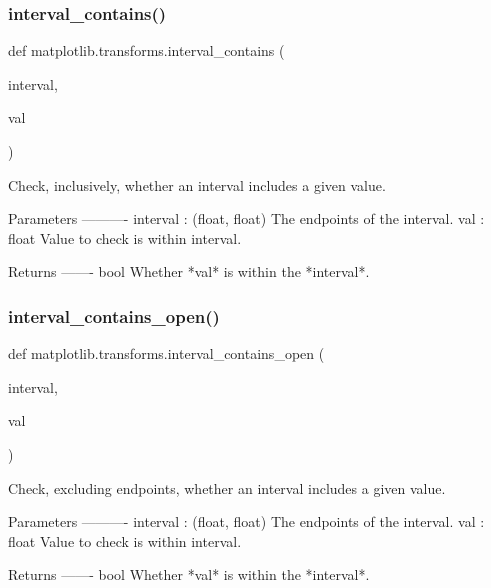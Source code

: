 \subsubsection{\texorpdfstring{interval\+\_\+contains()}{interval\_contains()}}
{\footnotesize\ttfamily def matplotlib.\+transforms.\+interval\+\_\+contains (\begin{DoxyParamCaption}\item[{}]{interval,  }\item[{}]{val }\end{DoxyParamCaption})}

\begin{DoxyVerb}Check, inclusively, whether an interval includes a given value.

Parameters
----------
interval : (float, float)
    The endpoints of the interval.
val : float
    Value to check is within interval.

Returns
-------
bool
    Whether *val* is within the *interval*.
\end{DoxyVerb}
 \mbox{\label{namespacematplotlib_1_1transforms_ae4b88bcadad39caf2af560a8cb37fea0}} 
\subsubsection{\texorpdfstring{interval\+\_\+contains\+\_\+open()}{interval\_contains\_open()}}
{\footnotesize\ttfamily def matplotlib.\+transforms.\+interval\+\_\+contains\+\_\+open (\begin{DoxyParamCaption}\item[{}]{interval,  }\item[{}]{val }\end{DoxyParamCaption})}

\begin{DoxyVerb}Check, excluding endpoints, whether an interval includes a given value.

Parameters
----------
interval : (float, float)
    The endpoints of the interval.
val : float
    Value to check is within interval.

Returns
-------
bool
    Whether *val* is within the *interval*.
\end{DoxyVerb}
 \mbox{\label{namespacematplotlib_1_1transforms_a65adff0cd8d4b864f5c3657a87e0c375}} 

